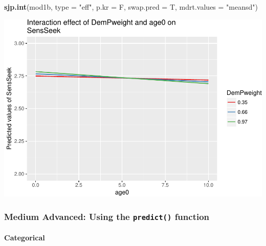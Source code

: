 \documentclass[]{article}
\newenvironment{Shaded}{\begin{snugshade}}{\end{snugshade}}
\newcommand{\KeywordTok}[1]{\textcolor[rgb]{0.13,0.29,0.53}{\textbf{#1}}}
\newcommand{\DataTypeTok}[1]{\textcolor[rgb]{0.13,0.29,0.53}{#1}}
\newcommand{\StringTok}[1]{\textcolor[rgb]{0.31,0.60,0.02}{#1}}
\newcommand{\NormalTok}[1]{#1}
\let\oldparagraph\paragraph
\renewcommand{\paragraph}[1]{\oldparagraph{#1}\mbox{}}
\begin{document}
\begin{Shaded}
\begin{Highlighting}[]
\KeywordTok{sjp.int}\NormalTok{(mod1b, }\DataTypeTok{type =} \StringTok{"eff"}\NormalTok{, }\DataTypeTok{p.kr =}\NormalTok{ F, }\DataTypeTok{swap.pred =}\NormalTok{ T, }\DataTypeTok{mdrt.values =} \StringTok{"meansd"}\NormalTok{)}
\end{Highlighting}
\end{Shaded}

\includegraphics{Conditional_Models_doc_files/figure-latex/unnamed-chunk-31-1.pdf}

\subsubsection{\texorpdfstring{Medium Advanced: Using the
\texttt{predict()}
function}{Medium Advanced: Using the predict() function}}\label{medium-advanced-using-the-predict-function}

\paragraph{Categorical}\label{categorical-1}
\end{document}
